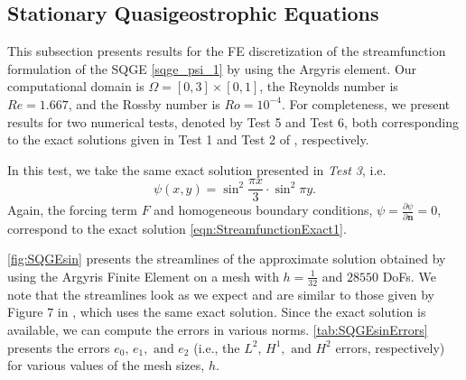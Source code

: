 \subsection{Stationary Quasigeostrophic Equations}\label{sse:SQGE}
This subsection presents results for the FE discretization of the streamfunction formulation of the
SQGE \eqref{sqge_psi_1} by using the Argyris element. Our computational domain is
$\Omega=[0,3]\times[0,1]$, the Reynolds number is $Re=1.667$, and the Rossby number is $Ro=10^{-4}$.
For completeness, we present results for two numerical tests, denoted by Test 5 and Test 6, both
corresponding to the exact solutions given in Test 1 and Test 2 of \cite{Cascon}, respectively.

In this test, we take the same exact solution presented in \emph{Test 3}, i.e.
\begin{equation}
  \psi(x,y) = \sin^2 \frac{\pi x}{3} \cdot \sin^2 \pi y.
  \label{eqn:StreamfunctionExact1}
\end{equation}
Again, the forcing term $F$ and homogeneous boundary conditions, $\psi = \frac{\partial
\psi}{\partial \mathbf{n}} = 0$, correspond to the exact solution \eqref{eqn:StreamfunctionExact1}.

\autoref{fig:SQGEsin} presents the streamlines of the approximate solution obtained by using the
Argyris Finite Element on a mesh with $h=\frac{1}{32}$ and $28550$ DoFs. We note that the
streamlines look as we expect and are similar to those given by Figure $7$ in \cite{Myers}, which
uses the same exact solution.  Since the exact solution is available, we can compute the errors in
various norms. \autoref{tab:SQGEsinErrors} presents the errors $e_0,\, e_1, \text{ and } e_2$ (i.e.,
the $L^2,\, H^1, \text{ and } H^2$ errors, respectively) for various values of the mesh sizes, $h$.

